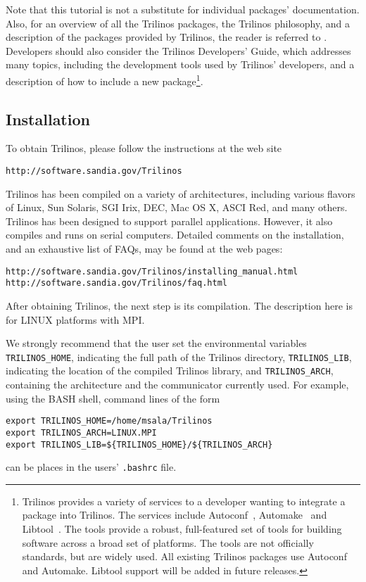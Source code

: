 \smallskip

Note that this tutorial is not a substitute for individual packages'
documentation. Also, for an overview of all the Trilinos packages, the
Trilinos philosophy, and a description of the packages provided by
Trilinos, the reader is referred to \cite{Trilinos-Overview}.
Developers should also consider the Trilinos Developers' Guide, which
addresses many topics, including the development tools used by Trilinos'
developers, and a description of how to include a new package\footnote{
  Trilinos provides a variety of services to a developer wanting to
  integrate a package into Trilinos.  The services include
  Autoconf~\cite{Autoconf}, Automake~\cite{Automake} and
  Libtool~\cite{Libtool}. The tools provide a robust, full-featured set
  of tools for building software across a broad set of platforms.  The
  tools are not officially standards, but are widely used.  All existing
  Trilinos packages use Autoconf and Automake.  Libtool support will be
  added in future releases.}.


\subsection{Installation}
\label{sec:installing}

To obtain Trilinos, please follow the instructions at the web site
\begin{verbatim}
http://software.sandia.gov/Trilinos
\end{verbatim}

Trilinos has been compiled on a variety of architectures, including
various flavors of Linux, Sun Solaris, SGI Irix, DEC, Mac OS X, ASCI
Red, and many others. Trilinos has been designed to support parallel
applications.  However, it also compiles and runs on serial computers.
Detailed comments on the installation, and an exhaustive list of FAQs,
may be found at the web pages:
\begin{verbatim}
http://software.sandia.gov/Trilinos/installing_manual.html
http://software.sandia.gov/Trilinos/faq.html
\end{verbatim}

After obtaining Trilinos, the next step is its compilation. The
description here is for LINUX platforms with MPI.

We strongly recommend that the user set the environmental variables
\verb!TRILINOS_HOME!, indicating the full path of the Trilinos
directory, \verb!TRILINOS_LIB!, indicating the location of the compiled
Trilinos library, and \verb!TRILINOS_ARCH!, containing the architecture
and the communicator currently used.  For example, using the BASH shell,
command lines of the form
\begin{verbatim}
export TRILINOS_HOME=/home/msala/Trilinos
export TRILINOS_ARCH=LINUX.MPI
export TRILINOS_LIB=${TRILINOS_HOME}/${TRILINOS_ARCH}
\end{verbatim}
can be places in the users' \verb!.bashrc! file.

